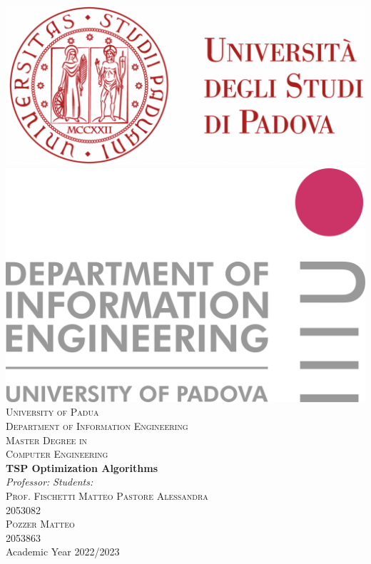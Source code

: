 \documentclass[a4paper,12pt]{book}
\begin{document}
\renewcommand{\contentsname}{Index}
\renewcommand{\chaptername}{Chapter}
\renewcommand{\bibname}{References}
\renewcommand{\figurename}{Figure}

\begin{titlepage}
\begin{center}

\includegraphics[scale=0.2]{images/logo_unipd.png} \hfill \includegraphics[scale=0.1]{images/logo_dei.png}\\
\vspace{0.8cm}
\textsc{\LARGE University of Padua}\\
\vspace{0.45cm}
\textsc{\large Department of Information Engineering}\\
\vspace{0.4cm}
\textsc{\large Master Degree in}\\
\textsc{\large Computer Engineering}\\
\vfill
{ \LARGE \bfseries TSP Optimization Algorithms
}\\
\vfill
\textit{\large Professor:} \hfill \textit{\large Students:}\\
\textsc{\large Prof. Fischetti Matteo} \hfill \textsc{Pastore Alessandra}\\
\hfill \textsc{2053082}\\
\hfill \textsc{Pozzer Matteo}\\
\hfill \textsc{2053863}\\

\vfill
{\large Academic Year 2022/2023}
\end{center}
\end{titlepage}
\end{document}
